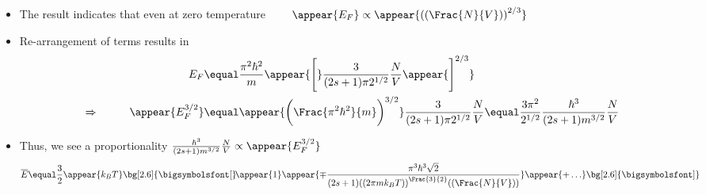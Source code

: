 \begin{frame}
\frametitle{\texorpdfstring{\culine[\sectiontitleulinecolor]{\sectiontitle}}{\sectiontitle} }

\begin{itemize}
	\item The result indicates that even at zero temperature $\qquad \appear{E_{F}} \propto \appear{\textrm{((}\Frac{N}{V} \textrm{))}^{2 / 3}}$

\item Re-arrangement of terms results in
\[
\begin{aligned}
& & E_{F}  &\equal \frac{\pi^{2} \hbar^{2}}{m} \appear{\Bigg[}\frac{3}{(2 s+1) \pi 2^{1/2}} \frac{N}{V} \appear{\Bigg]^{2 / 3}} \\
&\Rightarrow& \qquad \appear{E_{F}^{3 / 2}}  &\equal  \appear{ \bigg( \Frac{\pi^{2} \hbar^{2}}{m}  \bigg)^{3 / 2}} \frac{3}{(2 s+1) \pi 2^{1/2}} \frac{N}{V}  \equal  \frac{3 \pi^{2}}{2^{1/2}} \frac{\hbar^{3}}{(2 s+1) m^{3 / 2}} \frac{N}{V}
\end{aligned}
\]
\item Thus, we see a proportionality $\frac{\hbar^{3}}{(2 s+1) m^{3 / 2}} \frac{N}{V} \propto \appear{E_{F}^{3 / 2}}$ 
\[
\overline{E}  \equal \frac{3}{2} \appear{k_{B} T} \bg[2.6]{\text{\bigsymbolsfont[}}\! \appear{1} \appear{\mp \frac{\pi^{3} \hbar^{3} \sqrt{2}}{(2 s+1) \textrm{((}2 \pi m k_{B} T \textrm{))}^{\Frac{3}{2}} \textrm{((}\Frac{N}{V} \textrm{))} } } \appear{+\ldots} \bg[2.6]{\text{\bigsymbolsfont]}}
\]
\end{itemize}

\endofslide 
\end{frame}

